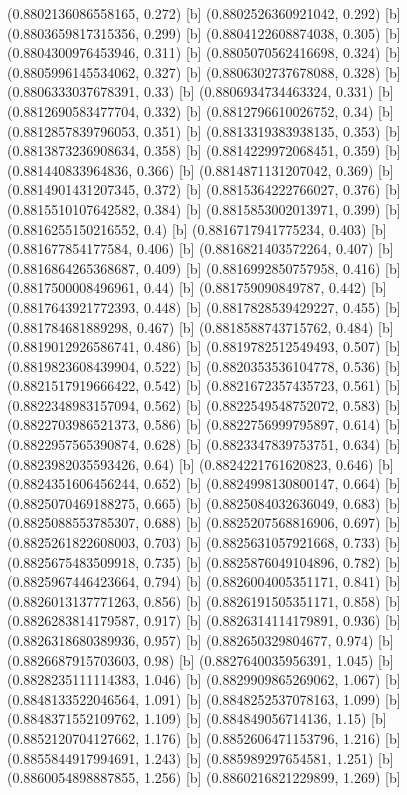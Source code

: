 {{{(0.8802136086558165, 0.272) [b] 
(0.8802526360921042, 0.292) [b] 
(0.8803659817315356, 0.299) [b] 
(0.8804122608874038, 0.305) [b] 
(0.8804300976453946, 0.311) [b] 
(0.8805070562416698, 0.324) [b] 
(0.8805996145534062, 0.327) [b] 
(0.8806302737678088, 0.328) [b] 
(0.8806333037678391, 0.33) [b] 
(0.8806934734463324, 0.331) [b] 
(0.8812690583477704, 0.332) [b] 
(0.8812796610026752, 0.34) [b] 
(0.8812857839796053, 0.351) [b] 
(0.8813319383938135, 0.353) [b] 
(0.8813873236908634, 0.358) [b] 
(0.8814229972068451, 0.359) [b] 
(0.881440833964836, 0.366) [b] 
(0.8814871131207042, 0.369) [b] 
(0.8814901431207345, 0.372) [b] 
(0.8815364222766027, 0.376) [b] 
(0.8815510107642582, 0.384) [b] 
(0.8815853002013971, 0.399) [b] 
(0.8816255150216552, 0.4) [b] 
(0.8816717941775234, 0.403) [b] 
(0.881677854177584, 0.406) [b] 
(0.8816821403572264, 0.407) [b] 
(0.8816864265368687, 0.409) [b] 
(0.8816992850757958, 0.416) [b] 
(0.8817500008496961, 0.44) [b] 
(0.881759090849787, 0.442) [b] 
(0.8817643921772393, 0.448) [b] 
(0.8817828539429227, 0.455) [b] 
(0.881784681889298, 0.467) [b] 
(0.8818588743715762, 0.484) [b] 
(0.8819012926586741, 0.486) [b] 
(0.8819782512549493, 0.507) [b] 
(0.8819823608439904, 0.522) [b] 
(0.8820353536104778, 0.536) [b] 
(0.8821517919666422, 0.542) [b] 
(0.8821672357435723, 0.561) [b] 
(0.8822348983157094, 0.562) [b] 
(0.8822549548752072, 0.583) [b] 
(0.8822703986521373, 0.586) [b] 
(0.8822756999795897, 0.614) [b] 
(0.8822957565390874, 0.628) [b] 
(0.8823347839753751, 0.634) [b] 
(0.8823982035593426, 0.64) [b] 
(0.8824221761620823, 0.646) [b] 
(0.8824351606456244, 0.652) [b] 
(0.8824998130800147, 0.664) [b] 
(0.8825070469188275, 0.665) [b] 
(0.8825084032636049, 0.683) [b] 
(0.8825088553785307, 0.688) [b] 
(0.8825207568816906, 0.697) [b] 
(0.8825261822608003, 0.703) [b] 
(0.8825631057921668, 0.733) [b] 
(0.8825675483509918, 0.735) [b] 
(0.8825876049104896, 0.782) [b] 
(0.8825967446423664, 0.794) [b] 
(0.8826004005351171, 0.841) [b] 
(0.8826013137771263, 0.856) [b] 
(0.8826191505351171, 0.858) [b] 
(0.8826283814179587, 0.917) [b] 
(0.8826314114179891, 0.936) [b] 
(0.8826318680389936, 0.957) [b] 
(0.882650329804677, 0.974) [b] 
(0.8826687915703603, 0.98) [b] 
(0.8827640035956391, 1.045) [b] 
(0.8828235111114383, 1.046) [b] 
(0.8829909865269062, 1.067) [b] 
(0.8848133522046564, 1.091) [b] 
(0.8848252537078163, 1.099) [b] 
(0.8848371552109762, 1.109) [b] 
(0.884849056714136, 1.15) [b] 
(0.8852120704127662, 1.176) [b] 
(0.8852606471153796, 1.216) [b] 
(0.8855844917994691, 1.243) [b] 
(0.885989297654581, 1.251) [b] 
(0.8860054898887855, 1.256) [b] 
(0.8860216821229899, 1.269) [b] 
}}}
